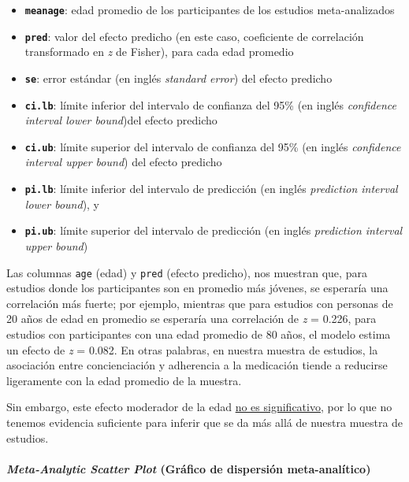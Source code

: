 \documentclass[
  bookmarksnumbered]{article}
\begin{document}
\begin{itemize}
\item
  \textbf{\texttt{meanage}}: edad promedio de los participantes de los estudios meta-analizados
\item
  \textbf{\texttt{pred}}: valor del efecto predicho (en este caso, coeficiente de correlación transformado en \emph{z} de Fisher), para cada edad promedio
\item
  \textbf{\texttt{se}}: error estándar (en inglés \emph{standard error}) del efecto predicho
\item
  \textbf{\texttt{ci.lb}}: límite inferior del intervalo de confianza del 95\% (en inglés \emph{confidence interval lower bound})del efecto predicho
\item
  \textbf{\texttt{ci.ub}}: límite superior del intervalo de confianza del 95\% (en inglés \emph{confidence interval upper bound}) del efecto predicho
\item
  \textbf{\texttt{pi.lb}}: límite inferior del intervalo de predicción (en inglés \emph{prediction interval lower bound}), y
\item
  \textbf{\texttt{pi.ub}}: límite superior del intervalo de predicción (en inglés \emph{prediction interval upper bound})
\end{itemize}

Las columnas \texttt{age} (edad) y \texttt{pred} (efecto predicho), nos muestran que, para estudios donde los participantes son en promedio más jóvenes, se esperaría una correlación más fuerte; por ejemplo, mientras que para estudios con personas de 20 años de edad en promedio se esperaría una correlación de \emph{z} = 0.226, para estudios con participantes con una edad promedio de 80 años, el modelo estima un efecto de \emph{z} = 0.082. En otras palabras, en nuestra muestra de estudios, la asociación entre concienciación y adherencia a la medicación tiende a reducirse ligeramente con la edad promedio de la muestra.

Sin embargo, este efecto moderador de la edad \underline{no es significativo}, por lo que no tenemos evidencia suficiente para inferir que se da más allá de nuestra muestra de estudios.

\hypertarget{meta-scatter}{%
\paragraph{\texorpdfstring{\emph{Meta-Analytic Scatter Plot} (Gráfico de dispersión meta-analítico)}{Meta-Analytic Scatter Plot (Gráfico de dispersión meta-analítico)}}\label{meta-scatter}}
\end{document}
